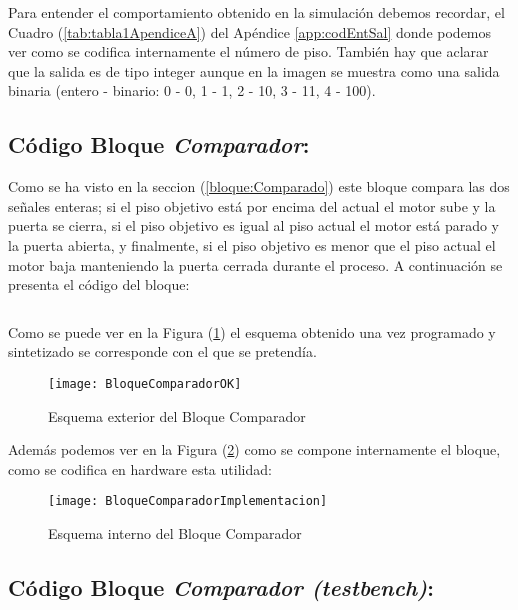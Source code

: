 	Para entender el comportamiento obtenido en la simulación debemos recordar, el Cuadro (\ref{tab:tabla1ApendiceA}) del Apéndice \ref{app:codEntSal} donde podemos ver como se codifica internamente el número de piso. También hay que aclarar que la salida es de tipo integer aunque en la imagen se muestra como una salida binaria (entero - binario: 0 - 0, 1 - 1, 2 - 10, 3 - 11, 4 - 100).

\subsection{Código Bloque \textit{Comparador}:} \label{code:Comparador}
	Como se ha visto en la seccion (\ref{bloque:Comparado}) este bloque compara las dos señales enteras; si el piso objetivo está por encima del actual el motor sube y la puerta se cierra, si el piso objetivo es igual al piso actual el motor está parado y la puerta abierta, y finalmente, si el piso objetivo es menor que el piso actual el motor baja manteniendo la puerta cerrada durante el proceso. A continuación se presenta el código del bloque: \\ 

    \inputminted[frame=lines,fontsize=\footnotesize,linenos]{vhdl}{CodeFiles/Comparador.vhd}	

	Como se puede ver en la Figura (\ref{fig:BloqueComparadorOK}) el esquema obtenido una vez programado y sintetizado se corresponde con el que se pretendía.
    \begin{figure}[H]
		    \centering
		    \texttt{[image: BloqueComparadorOK]}
		    \caption{Esquema exterior del Bloque Comparador}
		    \label{fig:BloqueComparadorOK}
	\end{figure}
    Además podemos ver en la Figura (\ref{fig:BloqueComparadorImplementacion}) como se compone internamente el bloque, como se codifica en hardware esta utilidad:
    \begin{figure}[H]
		    \centering
		    \texttt{[image: BloqueComparadorImplementacion]}
		    \caption{Esquema interno del Bloque Comparador}
		    \label{fig:BloqueComparadorImplementacion}
	\end{figure}

\subsection{Código Bloque \textit{Comparador (testbench)}:} \label{code:Comparador_tb}
    \inputminted[frame=lines,fontsize=\footnotesize,linenos]{vhdl}{CodeFiles/Comparador_tb.vhd}

